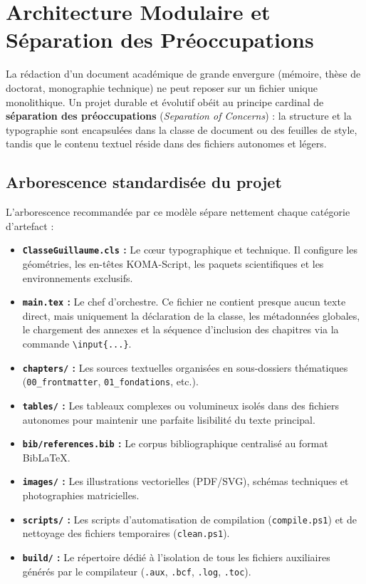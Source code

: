 \section{Architecture Modulaire et Séparation des Préoccupations}
\label{sec:architecture_projet}

La rédaction d'un document académique de grande envergure (mémoire, thèse de doctorat, monographie technique) ne peut reposer sur un fichier unique monolithique.
Un projet durable et évolutif obéit au principe cardinal de \textbf{séparation des préoccupations} (\emph{Separation of Concerns}) :
la structure et la typographie sont encapsulées dans la classe de document ou des feuilles de style, tandis que le contenu textuel réside dans des fichiers autonomes et légers.

\subsection{Arborescence standardisée du projet}
\label{subsec:arborescence}

L'arborescence recommandée par ce modèle sépare nettement chaque catégorie d'artefact :

\begin{itemize}
  \item \textbf{\texttt{ClasseGuillaume.cls} :} Le cœur typographique et technique. Il configure les géométries, les en-têtes KOMA-Script, les paquets scientifiques et les environnements exclusifs.
  \item \textbf{\texttt{main.tex} :} Le chef d'orchestre. Ce fichier ne contient presque aucun texte direct, mais uniquement la déclaration de la classe, les métadonnées globales, le chargement des annexes et la séquence d'inclusion des chapitres via la commande \texttt{\textbackslash input\{...\}}.
  \item \textbf{\texttt{chapters/} :} Les sources textuelles organisées en sous-dossiers thématiques (\texttt{00\_frontmatter}, \texttt{01\_fondations}, etc.).
  \item \textbf{\texttt{tables/} :} Les tableaux complexes ou volumineux isolés dans des fichiers autonomes pour maintenir une parfaite lisibilité du texte principal.
  \item \textbf{\texttt{bib/references.bib} :} Le corpus bibliographique centralisé au format Bib\LaTeX{}.
  \item \textbf{\texttt{images/} :} Les illustrations vectorielles (PDF/SVG), schémas techniques et photographies matricielles.
  \item \textbf{\texttt{scripts/} :} Les scripts d'automatisation de compilation (\texttt{compile.ps1}) et de nettoyage des fichiers temporaires (\texttt{clean.ps1}).
  \item \textbf{\texttt{build/} :} Le répertoire dédié à l'isolation de tous les fichiers auxiliaires générés par le compilateur (\texttt{.aux}, \texttt{.bcf}, \texttt{.log}, \texttt{.toc}).
\end{itemize}

